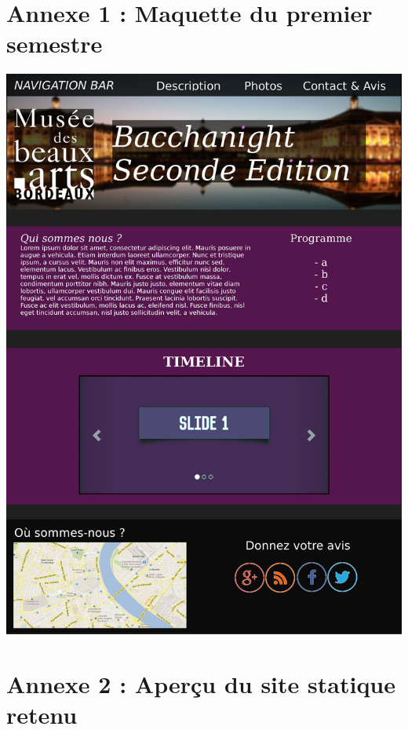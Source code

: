 \documentclass[11pt]{report}
\begin{document}

\newpage

\section*{Annexe 1 : Maquette du premier semestre}

\vspace{0.4cm}
\includegraphics[scale=0.75]{maquette.jpg}

\section*{Annexe 2 : Aperçu du site statique retenu}
\end{document}
